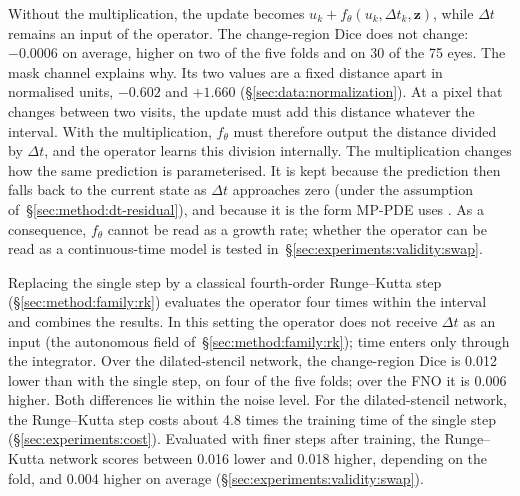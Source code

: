 Without the multiplication, the update becomes
$u_k + f_\theta(u_k, \Delta t_k, \mathbf{z})$, while $\Delta t$ remains an input of
the operator. The change-region Dice does not change: $-0.0006$ on
average, higher on two of the five folds and on 30 of the 75 eyes.
The mask channel explains why. Its two values are a fixed distance apart
in normalised units, $-0.602$ and $+1.660$
(\S\ref{sec:data:normalization}). At a pixel that changes between two
visits, the update must add this distance whatever the interval. With the
multiplication, $f_\theta$ must therefore output the distance divided by
$\Delta t$, and the operator learns this division internally. The
multiplication changes how the same prediction is parameterised. It is
kept because the prediction then falls back to the current state as
$\Delta t$ approaches zero (under the assumption
of~\S\ref{sec:method:dt-residual}), and because it is the form MP-PDE uses
\citep{Brandstetter2022}. As a consequence, $f_\theta$ cannot be read as a
growth rate; whether the operator can be read as a continuous-time model
is tested in~\S\ref{sec:experiments:validity:swap}.

Replacing the single step by a classical fourth-order Runge--Kutta step
(\S\ref{sec:method:family:rk}) evaluates the operator four times within the
interval and combines the results. In this setting the operator does not
receive $\Delta t$ as an input (the autonomous field
of~\S\ref{sec:method:family:rk}); time enters only through the integrator.
Over the dilated-stencil network, the change-region Dice is 0.012 lower
than with the single step, on four of the five folds; over the FNO it is
0.006 higher. Both differences lie within the noise level. For the
dilated-stencil network, the Runge--Kutta step costs about 4.8 times the
training time of the single step (\S\ref{sec:experiments:cost}).
Evaluated with finer steps after training, the Runge--Kutta network
scores between 0.016 lower and 0.018 higher, depending on the fold, and
0.004 higher on average (\S\ref{sec:experiments:validity:swap}).


